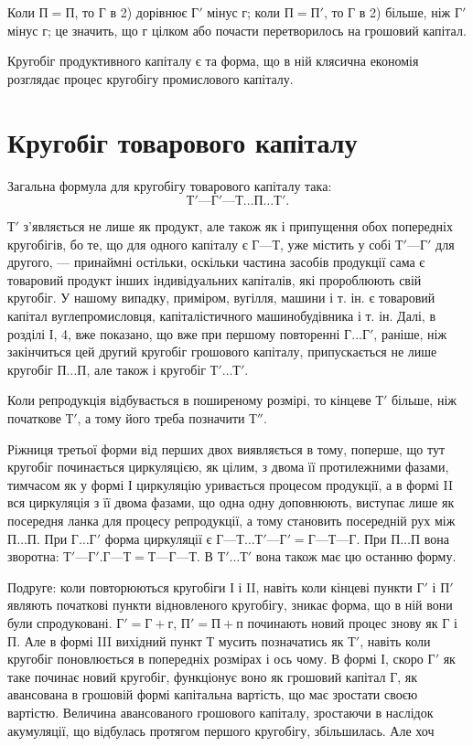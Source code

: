 Коли $П = П$, то $Г$ в 2) дорівнює $Г'$ мінус $г$; коли $П = П'$, то $Г$ в 2)
більше, ніж $Г'$ мінус $г$; це значить, що $г$ цілком або почасти перетворилось
на грошовий капітал.

Кругобіг продуктивного капіталу є та форма, що в ній клясична
економія розглядає процес кругобігу промислового капіталу.

\section{Кругобіг товарового капіталу}

Загальна формула для кругобігу товарового капіталу така:\[
Т' — Г' — Т\dots{} П\dots{} Т'.
\]

$Т'$ з’являється не лише як продукт, але також як і припущення обох
попередніх кругобігів, бо те, що для одного капіталу є $Г — Т$, уже містить
у собі $Т' — Г'$ для другого, — принаймні остільки, оскільки частина засобів
продукції сама є товаровий продукт інших індивідуальних капіталів,
які пророблюють свій кругобіг. У нашому випадку, приміром,
вугілля, машини і т. ін. є товаровий капітал вуглепромисловця, капіталістичного
машинобудівника і т. ін. Далі, в розділі І, 4, вже показано,
що вже при першому повторенні $Г\dots{} Г'$, раніше, ніж закінчиться цей
другий кругобіг грошового капіталу, припускається не лише кругобіг
$П\dots{} П$, але також і кругобіг $Т'\dots{} Т'$.

Коли репродукція відбувається в поширеному розмірі, то кінцеве $Т'$
більше, ніж початкове $Т'$, а тому його треба позначити $Т''$.

Ріжниця третьої форми від перших двох виявляється в тому, поперше,
що тут кругобіг починається циркуляцією, як цілим, з двома її протилежними
фазами, тимчасом як у формі І циркуляцію уривається процесом
продукції, а в формі II вся циркуляція з її двома фазами, що одна одну
доповнюють, виступає лише як посередня ланка для процесу репродукції,
а тому становить посередній рух між $П\dots{} П$. При $Г\dots{} Г'$ форма
циркуляції є $Г — Т\dots{} Т' — Г' = Г — Т — Г$. При $П\dots{} П$ вона зворотна:
$Т' — Г'.Г — Т = Т — Г — Т$. В $Т'\dots{} Т'$ вона також має цю останню
форму.

Подруге: коли повторюються кругобіги І і II, навіть коли кінцеві
пункти $Г'$ і $П'$ являють початкові пункти відновленого кругобігу, зникає
форма, що в ній вони були спродуковані. $Г' = Г + г$, $П' = П + п$ починають
новий процес знову як $Г$ і $П$. Але в формі III вихідний пункт $Т$
мусить позначатись як $Т'$, навіть коли кругобіг поновлюється в попередніх
розмірах і ось чому. В формі І, скоро $Г'$ як таке починає новий
кругобіг, функціонує воно як грошовий капітал $Г$, як авансована в грошовій
формі капітальна вартість, що має зростати своєю вартістю.
Величина авансованого грошового капіталу, зростаючи в наслідок акумуляції,
що відбулась протягом першого кругобігу, збільшилась. Але хоч
\parbreak{}  %
